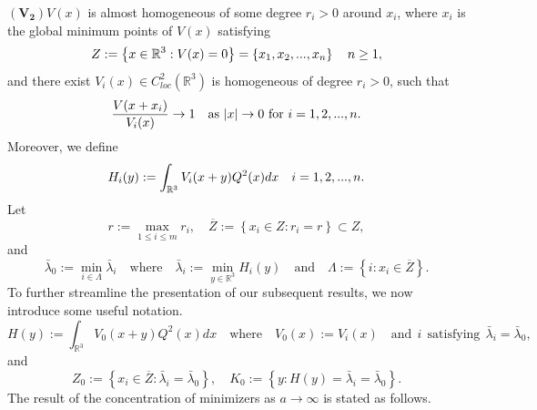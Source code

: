 \documentclass[reqno, 11pt]{amsart} %
\numberwithin{equation}{section}
\begin{document}
	$\mathbf{(V_2)}$\quad $V(x)$ is almost homogeneous of some degree $r_{i}>0$ around $x_{i}$, where $x_{i}$ is the global minimum points of $V(x)$ satisfying
	\begin{equation*}
		Z:=\left\lbrace x\in\mathbb{R}^{3}: V(x)=0\right\rbrace=\left\lbrace x_{1}, x_{2},...,x_{n}\right\rbrace \quad \hbox{$n\geq1$},
	\end{equation*}
	and there exist $V_{i}(x)\in C_{loc}^{2}(\mathbb{R}^{3})$ is homogeneous of degree $r_{i}>0$, such that
	\begin{equation}\label{equ9}
		\frac{V(x+x_{i})}{V_{i}(x)}\rightarrow1 \quad \hbox{as $|x|\rightarrow0$ for $i=1, 2,...,n $}.
	\end{equation}
Moreover, we define
	\begin{equation}\label{equ10}
		H_{i}(y):=	\int_{\mathbb{R}^{3}}V_{i}(x+y)Q^{2}(x)dx\quad \hbox{$i=1, 2,...,n$}.
	\end{equation}
	Let
	\begin{equation}\label{equ11}
		r:=\max_{1\leq i\leq m}r_{i}, \quad  \overline{Z}:=\left\lbrace x_{i}\in Z: r_{i}=r\right\rbrace \subset Z,
	\end{equation}
	and
	\begin{equation}\label{equ12}
		\bar{\lambda}_{0}:=\min_{i\in \Lambda}\bar{\lambda}_{i} \quad \mathrm {where} \quad \bar{\lambda}_{i}:=\min_{y\in\mathbb{R}^{3}}H_{i}(y)\quad \mathrm {and} \quad\Lambda:=\left\lbrace i: x_{i}\in\overline{Z}\right\rbrace.
	\end{equation}
	To further streamline the presentation of our subsequent results, we now introduce some useful notation.
	\begin{equation}\label{equ13}
		H(y):=	\int_{\mathbb{R}^{3}}V_{0}(x+y)Q^{2}(x)dx\quad \mathrm {where} \quad V_{0}(x):=V_{i}(x) \quad \mathrm {and }~~i~~\mathrm {satisfying }~~ \bar{\lambda}_{i}=\bar{\lambda}_{0},
	\end{equation}
	and
	\begin{equation}\label{equ14}
		Z_{0}:=\left\lbrace x_{i}\in\overline{Z}: \bar{\lambda}_{i}=\bar{\lambda}_{0}\right\rbrace,\quad K_{0}:=\left\lbrace y: H(y)= \bar{\lambda}_{i}=\bar{\lambda}_{0}\right\rbrace.
	\end{equation}
	The result of the concentration of minimizers as $a\rightarrow\infty$ is stated as follows. 
	
\end{document}
